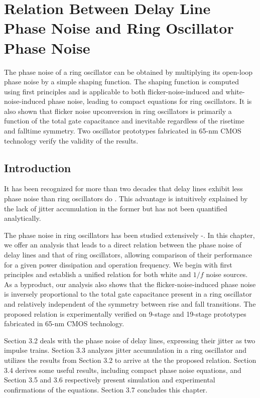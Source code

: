 \chapter{Relation Between Delay Line Phase Noise and Ring Oscillator Phase Noise}                        


The phase noise of a ring oscillator can be obtained by multiplying its open-loop phase noise by a simple shaping function. The shaping
function is computed using first principles and is applicable to both flicker-noise-induced and white-noise-induced phase noise, leading to
compact equations for ring oscillators. It is also shown that flicker noise upconversion in ring oscillators is primarily a function of the total gate capacitance and inevitable
regardless of the risetime and falltime symmetry. Two oscillator prototypes fabricated in 65-nm CMOS technology verify the validity of the results.







\section{Introduction}

It has been recognized for more than two decades that delay lines exhibit less phase noise than ring oscillators do \cite{Sonntag}. This advantage
is intuitively explained by the lack of jitter accumulation in the former but has not been quantified analytically.

The phase noise in ring oscillators has been studied extensively \cite{Weigandt}-\cite{Grozing}.
In this chapter, we offer an analysis that leads to a direct relation between the phase noise of delay lines and that of ring oscillators, allowing comparison of
their performance for a given power dissipation and operation frequency. 
We begin with first principles and establish a unified relation for both white and $1/f$ noise sources.
As a byproduct, our analysis also shows that the flicker-noise-induced phase noise is inversely proportional to the total gate capacitance present in a ring oscillator
and relatively independent of the symmetry between rise and fall transitions.
The proposed relation is experimentally verified on 9-stage and 19-stage prototypes fabricated in 65-nm CMOS technology.




Section 3.2 deals with the phase noise of delay lines, expressing their jitter as two impulse trains. Section 3.3 analyzes jitter accumulation in a ring oscillator and
utilizes the results from Section 3.2 to arrive at the the proposed relation. Section 3.4 derives some useful results, including compact phase noise equations,
and Section 3.5 and 3.6 respectively present simulation and experimental confirmations of the equations. Section 3.7 concludes this chapter.
 
